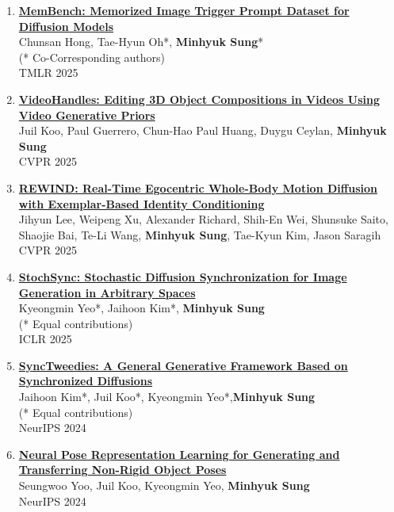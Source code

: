 \documentclass[letterpaper,10pt]{article} %
\newcommand{\blankline}{\quad\pagebreak[2]}
\begin{document}
\begin{enumerate}
\item \label{tmlr25}
\href{https://arxiv.org/abs/2407.17095}{\textbf{MemBench: Memorized Image Trigger Prompt Dataset for Diffusion Models}}\\
Chunsan Hong, Tae-Hyun Oh*, \textbf{Minhyuk Sung}*\\
(* Co-Corresponding authors)\\
TMLR 2025\\
\blankline

\item \label{cvpr25_2}
\href{https://www.arxiv.org/abs/2503.01107}{\textbf{VideoHandles: Editing 3D Object Compositions in Videos Using Video Generative Priors}}\\
Juil Koo, Paul Guerrero, Chun-Hao Paul Huang, Duygu Ceylan, \textbf{Minhyuk Sung}\\
CVPR 2025\\
\blankline

\item \label{cvpr25_1}
\href{https://arxiv.org/abs/2504.04956}{\textbf{REWIND: Real-Time Egocentric Whole-Body Motion Diffusion with Exemplar-Based Identity Conditioning}}\\
Jihyun Lee, Weipeng Xu, Alexander Richard, Shih-En Wei, Shunsuke Saito, Shaojie Bai, Te-Li Wang, \textbf{Minhyuk Sung}, Tae-Kyun Kim, Jason Saragih\\
CVPR 2025\\
\blankline

\item \label{iclr25}
\href{https://arxiv.org/abs/2501.15445}{\textbf{StochSync: Stochastic Diffusion Synchronization for Image Generation in Arbitrary Spaces}}\\
Kyeongmin Yeo*, Jaihoon Kim*, \textbf{Minhyuk Sung}\\
(* Equal contributions)\\
ICLR 2025\\
\blankline

\item \label{neurips24_4}
\href{https://arxiv.org/abs/2403.14370}{\textbf{SyncTweedies: A General Generative Framework Based on Synchronized Diffusions}}\\
Jaihoon Kim*, Juil Koo*, Kyeongmin Yeo*,\textbf{Minhyuk Sung}\\
(* Equal contributions)\\
NeurIPS 2024\\
\blankline

\item \label{neurips24_3}
\href{https://arxiv.org/abs/2406.09728}{\textbf{Neural Pose Representation Learning for Generating and Transferring Non-Rigid Object Poses}}\\
Seungwoo Yoo, Juil Koo, Kyeongmin Yeo, \textbf{Minhyuk Sung}\\
NeurIPS 2024\\
\blankline


\end{enumerate}
\end{document}
